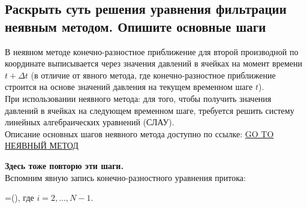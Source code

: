 

\subsection{Раскрыть суть решения уравнения фильтрации неявным методом. Опишите основные шаги}

В неявном методе конечно-разностное приближение для второй производной по координате выписывается через значения давлений в ячейках на момент времени $t+\Delta t$ (в отличие от явного метода, где конечно-разностное приближение строится на основе значений давления на текущем временном шаге $t$).
\\

При использовании неявного метода: для того, чтобы получить значения давлений в ячейках на следующем временном шаге, требуется решить систему линейных алгебраических уравнений (СЛАУ).
\\

Описание основных шагов неявного метода доступно по ссылке: \href{https://docs.yandex.ru/docs/view?url=ya-disk-public\%3A\%2F\%2FWicxck3PRHBvGgXBKaNry\%2FRtiluR1m6cR6Bi14xdyyNQDBM0D9VXsHr3EpLffWemDqZvSgIch5AN9ddz7ydViQ\%3D\%3D\%3A\%2F\%D0\%92\%D1\%82\%D0\%BE\%D1\%80\%D0\%BE\%D0\%B9\%20\%D0\%BA\%D1\%83\%D1\%80\%D1\%81\%20\%D0\%BC\%D0\%B0\%D0\%B3\%D0\%B8\%D1\%81\%D1\%82\%D1\%80\%D0\%B0\%D1\%82\%D1\%83\%D1\%80\%D1\%8B\%2F\%D0\%93\%D0\%B8\%D0\%B4\%D1\%80\%D0\%BE\%D0\%B4\%D0\%B8\%D0\%BD\%D0\%B0\%D0\%BC\%D0\%B8\%D1\%87\%D0\%B5\%D1\%81\%D0\%BA\%D0\%BE\%D0\%B5\%20\%D0\%BC\%D0\%BE\%D0\%B4\%D0\%B5\%D0\%BB\%D0\%B8\%D1\%80\%D0\%BE\%D0\%B2\%D0\%B0\%D0\%BD\%D0\%B8\%D0\%B5\%2F\%D0\%97\%D0\%B0\%D0\%B4\%D0\%B0\%D0\%BD\%D0\%B8\%D1\%8F\%2F\%D0\%9D\%D0\%B5\%D0\%B2\%D0\%BD\%D0\%BE\%D0\%B5_\%D1\%80\%D0\%B5\%D1\%88\%D0\%B5\%D0\%BD\%D0\%B8\%D0\%B5_\%D1\%83\%D1\%80\%D0\%B0\%D0\%B2\%D0\%BD\%D0\%B5\%D0\%BD\%D0\%B8\%D1\%8F_\%D1\%84\%D0\%B8\%D0\%BB\%D1\%8C\%D1\%82\%D1\%80\%D0\%B0\%D1\%86\%D0\%B8\%D0\%B8.pdf&name=\%D0\%9D\%D0\%B5\%D0\%B2\%D0\%BD\%D0\%BE\%D0\%B5_\%D1\%80\%D0\%B5\%D1\%88\%D0\%B5\%D0\%BD\%D0\%B8\%D0\%B5_\%D1\%83\%D1\%80\%D0\%B0\%D0\%B2\%D0\%BD\%D0\%B5\%D0\%BD\%D0\%B8\%D1\%8F_\%D1\%84\%D0\%B8\%D0\%BB\%D1\%8C\%D1\%82\%D1\%80\%D0\%B0\%D1\%86\%D0\%B8\%D0\%B8.pdf}{GO TO НЕЯВНЫЙ МЕТОД}

\textbf{Здесь тоже повторю эти шаги.}
\\

Вспомним явную запись конечно-разностного уравнения притока:

\beq
{}=\left(\right),
\eeq
где $i=2,...,N-1$.

